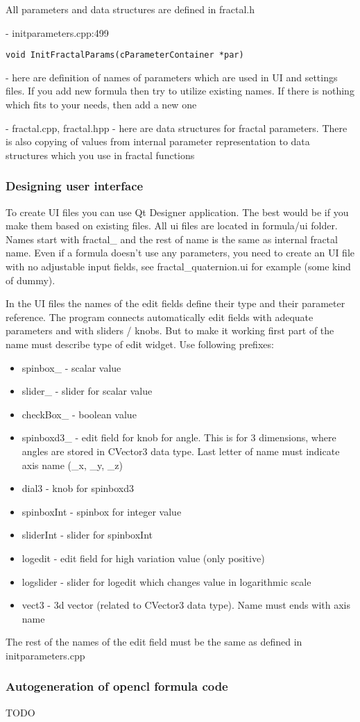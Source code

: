 All parameters and data structures are defined in fractal.h

- initparameters.cpp:499

\begin{lstlisting}
void InitFractalParams(cParameterContainer *par)
\end{lstlisting}

 - here are definition of names of parameters which are used in UI and settings files. If you add new formula then try to utilize existing names. If there is nothing which fits to your needs, then add a new one

- fractal.cpp, fractal.hpp - here are data structures for fractal parameters. There is also copying of values from internal parameter representation to data structures which you use in fractal functions

\subsubsection{Designing user interface}\label{developers-designing-user-interface}

To create UI files you can use Qt Designer application. The best would be if you make them based on existing files. All ui files are located in formula/ui folder. Names start with fractal\_ and the rest of name is the same as internal fractal name. Even if a formula doesn't use any parameters, you need to create an UI file with no adjustable input fields, see fractal\_quaternion.ui for example (some kind of dummy).

In the UI files the names of the edit fields define their type and their parameter reference. The program connects automatically edit fields with adequate parameters and with sliders / knobs. But to make it working first part of the name must describe type of edit widget. Use following prefixes:
\begin{itemize}
	\item spinbox\_ - scalar value
	\item slider\_ - slider for scalar value
	\item checkBox\_ - boolean value
	\item spinboxd3\_ - edit field for knob for angle. This is for 3 dimensions, 
		where angles are stored in CVector3 data type. Last letter of name must indicate axis name (\_x, \_y, \_z)
	\item dial3 - knob for spinboxd3
	\item spinboxInt - spinbox for integer value
	\item sliderInt - slider for spinboxInt
	\item logedit - edit field for high variation value (only positive)
	\item logslider - slider for logedit which changes value in logarithmic scale
	\item vect3 - 3d vector (related to CVector3 data type). Name must ends with axis name
\end{itemize}

The rest of the names of the edit field must be the same as defined in initparameters.cpp

\subsubsection{Autogeneration of opencl formula code}\label{developers-autogen-opencl-formulas}

TODO
